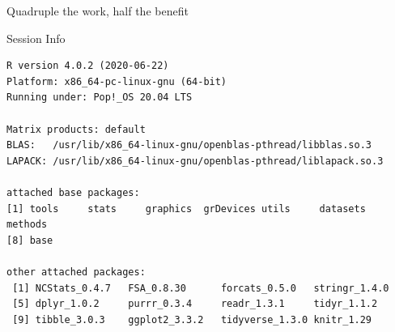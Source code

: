 \documentclass[10pt]{beamer}\usepackage[]{graphicx}\usepackage[]{color}
\makeatletter
\newenvironment{kframe}{%
 \def\at@end@of@kframe{}%
 \ifinner\ifhmode%
  \def\at@end@of@kframe{\end{minipage}}%
  \begin{minipage}{\columnwidth}%
 \fi\fi%
 \def\FrameCommand##1{\hskip\@totalleftmargin \hskip-\fboxsep
 \colorbox{shadecolor}{##1}\hskip-\fboxsep
     \hskip-\linewidth \hskip-\@totalleftmargin \hskip\columnwidth}%
 \MakeFramed {\advance\hsize-\width
   \@totalleftmargin\z@ \linewidth\hsize
   \@setminipage}}%
 {\par\unskip\endMakeFramed%
 \at@end@of@kframe}
\newenvironment{knitrout}{}{} %
\makeatother
\begin{document}
\begin{frame}[fragile]{Quadruple the work, half the benefit}
	
\end{frame}

	\begin{frame}[fragile]{Session Info}
	\tiny
	
\begin{knitrout}\tiny
{}\color{fgcolor}\begin{kframe}
\begin{verbatim}
R version 4.0.2 (2020-06-22)
Platform: x86_64-pc-linux-gnu (64-bit)
Running under: Pop!_OS 20.04 LTS

Matrix products: default
BLAS:   /usr/lib/x86_64-linux-gnu/openblas-pthread/libblas.so.3
LAPACK: /usr/lib/x86_64-linux-gnu/openblas-pthread/liblapack.so.3

attached base packages:
[1] tools     stats     graphics  grDevices utils     datasets  methods  
[8] base     

other attached packages:
 [1] NCStats_0.4.7   FSA_0.8.30      forcats_0.5.0   stringr_1.4.0  
 [5] dplyr_1.0.2     purrr_0.3.4     readr_1.3.1     tidyr_1.1.2    
 [9] tibble_3.0.3    ggplot2_3.3.2   tidyverse_1.3.0 knitr_1.29     


\end{verbatim}
\end{kframe}
\end{knitrout}
\end{frame}
\end{document}
